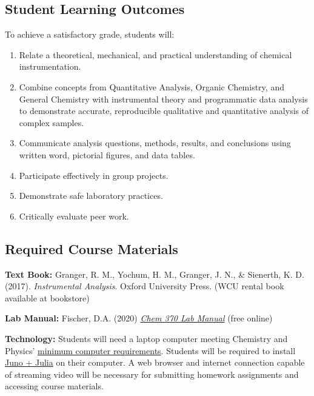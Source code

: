 \documentclass[]{tufte-book}
\begin{document}
\hypertarget{student-learning-outcomes}{%
\subsection*{Student Learning Outcomes}\label{student-learning-outcomes}}

To achieve a satisfactory grade, students will:

\begin{enumerate}
\def\labelenumi{\arabic{enumi}.}
\item
  Relate a theoretical, mechanical, and practical understanding of chemical instrumentation.
\item
  Combine concepts from Quantitative Analysis, Organic Chemistry, and General Chemistry with instrumental theory and programmatic data analysis to demonstrate accurate, reproducible qualitative and quantitative analysis of complex samples.
\item
  Communicate analysis questions, methods, results, and conclusions using written word, pictorial figures, and data tables.
\item
  Participate effectively in group projects.
\item
  Demonstrate safe laboratory practices.
\item
  Critically evaluate peer work.
\end{enumerate}

\hypertarget{required-course-materials}{%
\subsection*{Required Course Materials}\label{required-course-materials}}

\textbf{Text Book:} Granger, R. M., Yochum, H. M., Granger, J. N., \& Sienerth, K. D. (2017). \emph{Instrumental Analysis}. Oxford University Press. (WCU rental book available at bookstore)

\textbf{Lab Manual:} Fischer, D.A. (2020) \emph{\href{\%7B\%7Bsite.baseurl\%7D\%7D/devel/chem370/lab-manual}{Chem 370 Lab Manual}} (free online)

\textbf{Technology:} Students will need a laptop computer meeting Chemistry and Physics' \href{https://www.wcu.edu/learn/academic-services/it/computer-guidelines/index.aspx}{minimum computer requirements}. Students will be required to install \href{https://junolab.org/}{Juno + Julia} on their computer. A web browser and internet connection capable of streaming video will be necessary for submitting homework assignments and accessing course materials.
\end{document}
